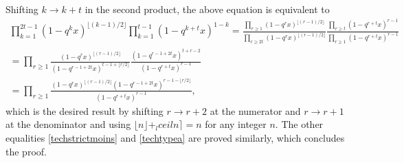 \documentclass[11pt,letterpaper]{amsart}
\numberwithin{equation}{section}
\numberwithin{df}{section}
\begin{document}
\noindent Shifting $k\to k+t$ in the second product, the above equation is equivalent to
\begin{multline*}
\prod_{k=1}^{2t-1} \left(1-q^{k}x\right)^{\lfloor(k-1)/2\rfloor} \prod_{k=1}^{t-1} \left(1-q^{k+t}x\right)^{1-k}=\frac{\prod_{r\geq 1}\left(1-q^{r}x\right)^{\lfloor(r-1)/2\rfloor}}{\prod_{r\geq 2t}\left(1-q^{r}x\right)^{\lfloor(r-1)/2\rfloor}}\frac{\prod_{r\geq t} \left(1-q^{r+t}x\right)^{r-1}}{\prod_{r\geq 1} \left(1-q^{r+t}x\right)^{r-1}}\\
=\prod_{r\geq 1}\frac{\left(1-q^{r}x\right)^{\lfloor(r-1)/2\rfloor}}{\left(1-q^{r-1+2t}x\right)^{t-1+\lfloor r/2\rfloor}}\frac{ \left(1-q^{r-1+2t}x\right)^{t+r-2}}{\left(1-q^{r+t}x\right)^{r-1}}\\
=\prod_{r\geq 1} \frac{\left(1-q^{r}x\right)^{\lfloor(r-1)/2\rfloor}\left(1-q^{r-1+2t}x\right)^{r-1-\lfloor r/2\rfloor}}{\left(1-q^{r+t}x\right)^{r-1}},
\end{multline*}
which is the desired result by shifting $r\to r+2$ at the numerator and $r\to r+1$ at the denominator and using $\lfloor n\rfloor + _lceil n\rceil=n$ for any integer $n$.
%
%
The other equalities \eqref{techstrictmoins} and \eqref{techtypea} are proved similarly, which concludes the proof.





%

%

%
\end{document}
